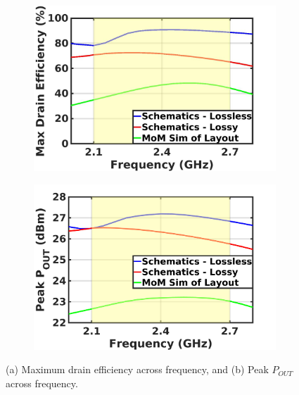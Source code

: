\documentclass[conference]{IEEEtran}
\begin{document}
\begin{figure}[!t]
\captionsetup{font=footnotesize}
\centering
\begin{subfigure}{0.24\textwidth}
\centering
\includegraphics[width=1\textwidth]{Images/Output_Network_Comp/Comp_DE_loss_layout.jpg}
\caption{}
\label{fig:Comp_DE_loss_layout}
\end{subfigure}
\begin{subfigure}{0.24\textwidth}
\includegraphics[width=1\textwidth]{Images/Output_Network_Comp/Comp_Pout_loss_layout.jpg}
\caption{}
\label{fig:Comp_Pout_loss_layout}
\end{subfigure}
\caption{(a) Maximum drain efficiency across frequency, and (b) Peak $P_{OUT}$ across frequency.}
\label{fig:Comp_Pout_DE}
\vspace{-0.1in}
\end{figure}
\end{document}
